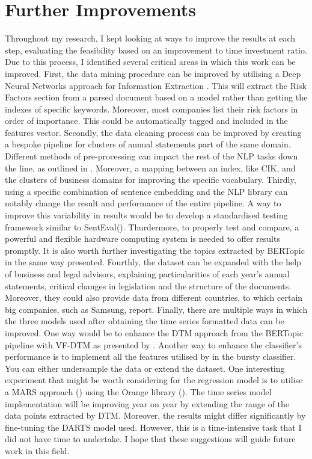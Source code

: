 \documentclass[12pt,MSc,a4paper,oneside]{muthesis}
\begin{document}
\section{Further Improvements}
Throughout my research, I kept looking at ways to improve the results at each step, evaluating the feasibility based on an improvement to time investment ratio. Due to this process, I identified several critical areas in which this work can be improved.
First, the data mining procedure can be improved by utilising a Deep Neural Networks approach for Information Extraction \cite{Gogar2016DeepNN}. This will extract the Risk Factors section from a parsed document based on a model rather than getting the indexes of specific keywords. Moreover, most companies list their risk factors in order of importance. This could be automatically tagged and included in the features vector.
Secondly, the data cleaning process can be improved by creating a bespoke pipeline for clusters of annual statements part of the same domain. Different methods of pre-processing can impact the rest of the NLP tasks down the line, as outlined in \cite{qi-etal-2018-pre}. Moreover, a mapping between an index, like CIK, and the clusters of business domains for improving the specific vocabulary.
Thirdly, using a specific combination of sentence embedding and the NLP library can notably change the result and performance of the entire pipeline. A way to improve this variability in results would be to develop a standardised testing framework similar to SentEval(\cite{Conneau2017SupervisedLO}). Thurdermore, to properly test and compare, a powerful and flexible hardware computing system is needed to offer results promptly. It is also worth further investigating the topics extracted by BERTopic in the same way \cite{ABUHAY2018193} presented. Fourthly, the dataset can be expanded with the help of business and legal advisors, explaining particularities of each year's annual statements, critical changes in legislation and the structure of the documents. Moreover, they could also provide data from different countries, to which certain big companies, such as Samsung, report.
Finally, there are multiple ways in which the three models used after obtaining the time series formatted data can be improved. One way would be to enhance the DTM approach from the BERTopic pipeline with VF-DTM as presented by \cite{HalimaBanu2016TrendingTA}. Another way to enhance the classifier's performance is to implement all the features utilised by \cite{Tattershall2019DetectingBT} in the bursty classifier. You can either undersample the data or extend the dataset. One interesting experiment that might be worth considering for the regression model is to utilise a MARS approach (\cite{wiki:mars}) using the Orange library (\cite{JMLR:demsar13a}). The time series model implementation will be improving year on year by extending the range of the data points extracted by DTM. Moreover, the results might differ significantly by fine-tuning the DARTS model used. However, this is a time-intensive task that I did not have time to undertake.
I hope that these suggestions will guide future work in this field.
\end{document}
